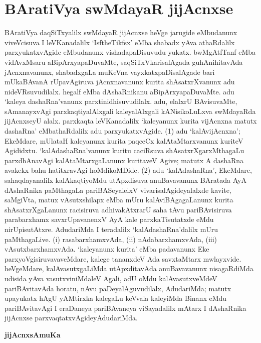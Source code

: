 \chapter{BAratiVya swMdayaR jijAcnxse}\label{chap006}

BAratiVya daqSiTxyalilx swMdayaR jijAcnxse heVge jarugide eMbudanunx viveVcisuva I leVKanadalilx `IsftheTikfsx' eMba shabadx yAva athaRdalilx parxyukatxvAgide eMbu\-danunx vishadapaDisuvudu yukatx. bwMgAtfTanf eMba vidAvxMsaru aBipArxyapaDuvaMte, saqSiTxVkarisalAgada guhAnihitavAda jAcnxnavanunx, shabadxgaLa muKeVna vayxkatxpaDisalAgade bari mUkaBAvanA rUpavAgiruva jAcnxnavanunx kurita shAsatxrXvanunx adu nideVRsuvu\-dilalx. hegalf eMba dAshaRnikanu aBipArxyapaDuvaMte. adu `kaleya dashaRna'vanunx parxtinidhisuvudilalx. adu, elalxrU BAvisuvaMte, sAmanayxvAgi parxkaqtiyalAlxgali kaleyalAlxgali kANisikoLuLxva swMdayaRda jijAcnxseyU alalx. parxkaqta leVKanadalilx `kaleyanunx kurita vijAcnxna matutx dashaRna' eMbathaRdalilx adu parxyukatxvAgide. (1) adu `kalAvijAcnxna'; EkeMdare, mUlataH kaleyanunx kurita paqceCx kalAtaMtarxvanunx kuriteV Agididxtu. `kalAdashaRna'vanunx kuritu caciRsuva shAsatxrXgarxMthagaLu parxdhAnavAgi kalAtaMtarxgaLanunx kuritaveV Agive; matutx A dashaRna avakekx bahu hatitxravAgi hoMdikoMDide. (2) adu `kalAdashaRna', EkeMdare, sahaqdayanalilx kalAkaqtiyoMdu utApxdisuva anuBavavanunx BAratada AyA dAshaRnika paMthagaLa pariBASeyalelxV vivarisalAgideyalalxde kavite, saMgiVta, matux vAsutxshilapx eMba mUru kalAviBAgagaLanunx kurita shAsatxrXgaLanunx racisiruva adhivakAtxrarU saha tAvu pariBAvisiruva parabarxhamx savxrUpavanenxV AyA kale parxkaTisutatxde eMdu nirUpisutAtxre. AdudariMda I teradalilx `kalAdashaRna'dalilx mUru paMthagaLive. {\rm(i)} rasabarxhamxvAda, {\rm(ii)} nAdabarxhamxvAda, {\rm(iii)} vAsutxbarxhamxvAda. `kaleyanunx kurita' eMba padavanunx Eke parxyoVgisiruvavaveMdare, kalege tananxdeV Ada savxtaMtarx mwlayxvide. heVgeMdare, kalAvasutxgaLiMda utApxditavAda anuBavavanunx nisagaRdiMda udisida yAva vasutxviniMdaleV Agali, adU oMdu kalAvasutxveMdeV pariBAvitavAda horatu, nAvu paDeyalAguvudilalx, AdudariMda; matutx upayukatx hAgU yAMtirxka kalegaLu keVvala kaleyiMda Binanx eMdu pariBAvitavAgi I eraDaneya pariBAvaneya viSayadalilx mAtarx I dAshaRnika jijAcnxse parxvaqtatxvAgideyAdudariMda.

\bigskip
\begin{center}
{\Large\bf jijAcnxsAmuKa}
\end{center}

